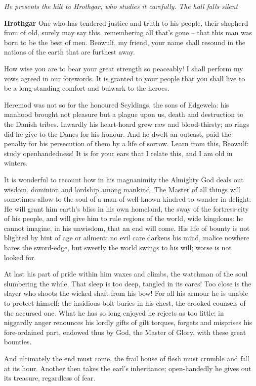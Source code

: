 \documentclass[a4paper]{article}
\begin{document}
{\centerline{\textit{He presents the hilt to Hrothgar, who studies it carefully. The hall falls silent}}

\textbf{Hrothgar} One who has tendered justice and truth to his people,
 their shepherd from of old, surely may say this,
remembering all that’s gone – that this man was born
to be the best of men. Beowulf, my friend,
your name shall resound in the nations of the earth
that are furthest away.

How wise you are to bear
your great strength so peaceably! I shall perform my vows
agreed in our forewords. It is granted to your people
that you shall live to be a long-standing comfort
and bulwark to the heroes.

Heremod was not so
for the honoured Scyldings, the sons of Edgewela:
his manhood brought not pleasure but a plague upon us,
death and destruction to the Danish tribes.
Inwardly his heart-hoard
grew raw and blood-thirsty; no rings did he give
to the Danes for his honour. And he dwelt an outcast,
paid the penalty for his persecution of them
by a life of sorrow. Learn from this, Beowulf:
study openhandedness! It is for your ears that I relate this,
and I am old in winters.

It is wonderful to recount
how in his magnanimity the Almighty God
deals out wisdom, dominion and lordship
among mankind. The Master of all things
will sometimes allow to the soul of a man
of well-known kindred to wander in delight:
He will grant him earth’s bliss in his own homeland,
the sway of the fortress-city of his people,
and will give him to rule regions of the world,
wide kingdoms: he cannot imagine,
in his unwisdom, that an end will come.
His life of bounty is not blighted by hint
of age or ailment; no evil care
darkens his mind, malice nowhere
bares the sword-edge, but sweetly the world
swings to his will; worse is not looked for.

At last his part of pride within him
waxes and climbs, the watchman of the soul
slumbering the while. That sleep is too deep,
tangled in its cares! Too close is the slayer
who shoots the wicked shaft from his bow!
For all his armour he is unable to protect himself:
the insidious bolt buries in his chest,
the crooked counsels of the accursed one.
What he has so long enjoyed he rejects as too little;
in niggardly anger renounces his lordly
gifts of gilt torques, forgets and misprises
his fore-ordained part, endowed thus by God,
the Master of Glory, with these great bounties.

And ultimately the end must come,
the frail house of flesh must crumble
and fall at its hour. Another then takes
the earl’s inheritance; open-handedly
he gives out its treasure, regardless of fear.

}
\end{document}
